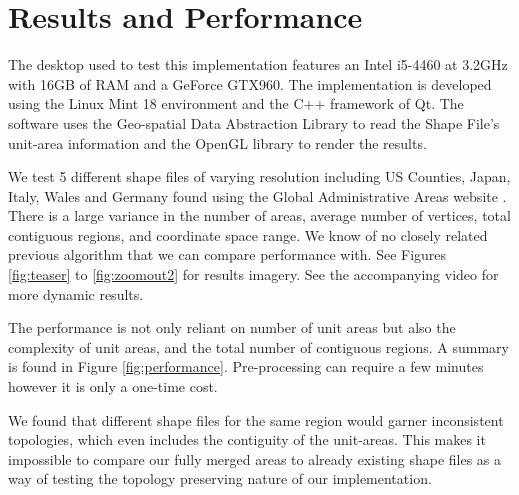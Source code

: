 
\section{Results and Performance} \label{performance}
The desktop used to test this implementation features an Intel i5-4460 at 3.2GHz with 16GB of RAM and a GeForce GTX960. The implementation is developed using the Linux Mint 18 environment and the C++ framework of Qt. The software uses the Geo-spatial Data Abstraction Library to read the Shape File's unit-area information \cite{GDAL} and the OpenGL library to render the results.


We test 5 different shape files of varying resolution including US Counties, Japan, Italy, Wales and Germany found using the Global Administrative Areas website \cite{GAA}. There is a large variance in the number of areas, average number of vertices, total contiguous regions, and coordinate space range. We know of no closely related previous algorithm that we can compare performance with. See Figures \ref{fig:teaser} to \ref{fig:zoomout2} for results imagery. See the accompanying video for more dynamic results.

The performance is not only reliant on number of unit areas but also the complexity of unit areas, and the total number of contiguous regions. A summary is found in Figure \ref{fig:performance}. Pre-processing can require a few minutes however it is only a one-time cost.
 
We found that different shape files for the same region would garner inconsistent topologies, which even includes the contiguity of the unit-areas. This makes it impossible to compare our fully merged areas to already existing shape files as a way of testing the topology preserving nature of our implementation. 

